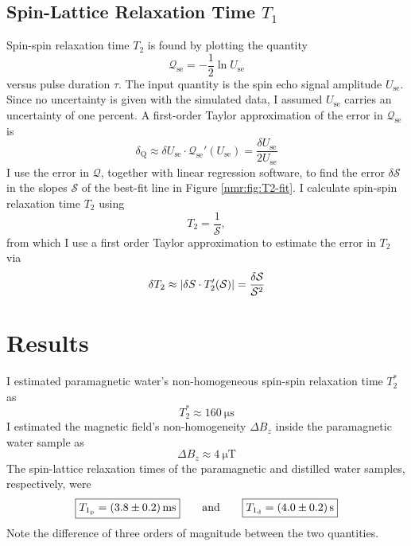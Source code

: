 \documentclass[11pt, a4paper]{article}
\newcommand{\eqtext}[1]{\qquad \text{#1} \qquad}
\begin{document}
\subsection{Spin-Lattice Relaxation Time $ T_{1} $}
Spin-spin relaxation time $ T_{2} $ is found by plotting the quantity
\begin{equation*}
	\mathcal{Q}_{\text{se}}= -\frac{1}{2}\ln U_{\text{se}}
\end{equation*}
versus pulse duration $ \tau $. The input quantity is the spin echo signal amplitude $ U_{\text{se}} $. Since no uncertainty is given with the simulated data, I assumed $ U_{\text{se}} $ carries an uncertainty of one percent. A first-order Taylor approximation of the error in $ \mathcal{Q}_{\text{se}} $ is
\begin{equation*}
	\delta_{\text{Q}} \approx \delta U_{\text{se}}\cdot \mathcal{Q}_{\text{se}}'(U_{\text{se}})  = \frac{\delta U_{\text{se}}}{2U_{\text{se}}}
\end{equation*}
I use the error in $ \mathcal{Q} $, together with linear regression software, to find the error $ \delta \mathcal{S} $ in the slopes $ \mathcal{S} $ of the best-fit line in Figure \ref{nmr:fig:T2-fit}.  I calculate spin-spin relaxation time $ T_{2} $ using
\begin{equation*}
	T_{2} = \frac{1}{\mathcal{S}},
\end{equation*}
from which I use a first order Taylor approximation to estimate the error in $ T_{2} $ via
\begin{equation*}
	\delta T_{2} \approx \abs{\delta S \cdot T_{2}'(\mathcal{S})} =  \frac{\delta \mathcal{S}}{\mathcal{S}^{2}}
\end{equation*}


\section{Results}
I estimated paramagnetic water's non-homogeneous spin-spin relaxation time $ T_{2}^{*} $ as
\begin{equation*}
	\boxed{T_{2}^{*} \approx \SI{160}{\micro \second}} 
\end{equation*}
I estimated the magnetic field's non-homogeneity $ \Delta B_{z} $ inside the paramagnetic water sample as
\begin{equation*}
	\boxed{\Delta B_{z} \approx \SI{4}{\micro \tesla}} 
\end{equation*}
The spin-lattice relaxation times of the paramagnetic and distilled water samples, respectively, were
\begin{equation*}
	\boxed{T_{1_{\text{p}}} = \SI{3.8 \pm 0.2}{\milli \second}} \eqtext{and} \boxed{T_{1_{\text{d}}} = \SI{4.0 \pm 0.2}{\second}}
\end{equation*}
Note the difference of three orders of magnitude between the two quantities. 
\end{document}
